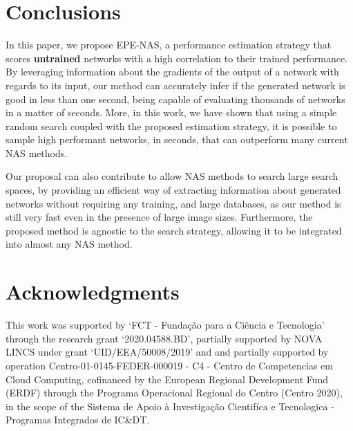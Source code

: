 \documentclass[10pt, conference]{IEEEtran}
\begin{document}
\section{Conclusions}
\label{conclusions}
In this paper, we propose EPE-NAS, a performance estimation strategy that scores \textbf{untrained} networks with a high correlation to their trained performance. By leveraging information about the gradients of the output of a network with regards to its input, our method can accurately infer if the generated network is good in less than one second, being capable of evaluating thousands of networks in a matter of seconds. More, in this work, we have shown that using a simple random search coupled with the proposed estimation strategy, it is possible to sample high performant networks, in seconds, that can outperform many current NAS methods.

Our proposal can also contribute to allow NAS methods to search large search spaces, by providing an efficient way of extracting information about generated networks without requiring any training, and large databases, as our method is still very fast even in the presence of large image sizes. Furthermore, the proposed method is agnostic to the search strategy, allowing it to be integrated into almost any NAS method.




\section*{Acknowledgments}
This work was supported by `FCT - Fundação para a Ciência e Tecnologia' through the research grant `2020.04588.BD', partially supported by NOVA LINCS under grant `UID/EEA/50008/2019' and and partially supported by operation Centro-01-0145-FEDER-000019 - C4 - Centro de Competencias em Cloud Computing, cofinanced by the European Regional Development Fund (ERDF) through the Programa Operacional Regional do Centro (Centro 2020), in the scope of the Sistema de Apoio à Investigação Cientifíca e Tecnologica - Programas Integrados de IC\&DT.
\end{document}
